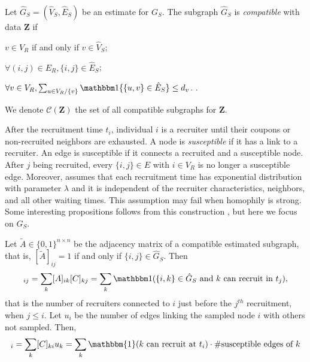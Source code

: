 \begin{definition}[Compatibility]
  Let $\hat{G}_S = (\hat{V}_S, \hat{E}_S)$ be an estimate for $G_S$. The 
  subgraph $\hat{G}_S$ is {\em compatible} with data $\boldsymbol{Z}$ if 
  \begin{alineas}
    \item $v \in V_R$ if and only if $v \in \hat{V}_S$;
    \item $\forall (i,j) \in E_R, \{i,j\} \in \hat{E}_S$;
    \item $\forall v \in V_R, \sum_{u \in V_R / \{v\}} \ind\{\{u,v\} \in
    \hat{E}_S\} \le d_v$. \cite[p. 197]{crawford2016}.
  \end{alineas}
  We denote $\mathcal{C}(\boldsymbol{Z})$ the set of all compatible subgraphs
  for $\boldsymbol{Z}$. 
\end{definition}

After the recruitment time $t_i$, individual $i$ is a recruiter until 
their coupons or non-recruited neighbors are exhausted. 
A node is {\em susceptible} if it has a link to a recruiter. An edge is
susceptible if it connects a recruited and a susceptible node. After $j$ being
recruited, every $\{i,j\} \in E$ with $i \in V_R$ is no longer a susceptible
edge. Moreover, \textcite[p. 194]{crawford2016} assumes that each recruitment time
has exponential distribution with parameter $\lambda$ and it is independent of
the recruiter characteristics, neighbors, and all other waiting times. This assumption may
fail when homophily is strong. Some interesting propositions follows from this
construction \cite[p. 195]{crawford2016}, but here we focus on $G_S$. 

Let $\tilde{A} \in \{0,1\}^{n \times n}$ be the adjacency matrix of a  
compatible estimated subgraph, that is, $[\tilde{A}]_{ij} = 1$ if and only 
if $\{i,j\} \in \hat{G}_S$.
Then 
\begin{equation*}
  [AC]_{ij} = \sum_{k} [A]_{ik}[C]_{kj} = \sum_{k} \ind(\{i,k\} \in \hat{G}_S \text{ and } k \text{ can recruit in } t_j),  
\end{equation*}
that is the number of recruiters connected to $i$ just before the $j^{th}$
recruitment, when $j \le i$. Let $u_i$ be the number of edges linking the
sampled node $i$ with others not sampled. Then,
\begin{equation*}
  [C^T u]_{i} = \sum_{k} [C]_{ki} u_k  = \sum_k \mathbbm{1}(k \text{ can recruit at } t_i)\cdot \#\text{susceptible edges of }k 
\end{equation*}

